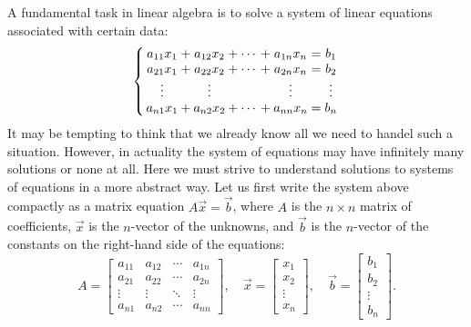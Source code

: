 \documentclass{ximera}
\begin{document}
A fundamental task in linear algebra is to solve a system of linear
equations associated with certain data:
\begin{equation*}
  \left\{ \,
  \begin{array}{*{9}{@{}c@{}}}
    a_{11} x_1      & {}+{} & a_{12} x_2 & {}+{} & \cdots & {}+{} & a_{1n} x_n
                    &
    {}\mathrel{=}{} & b_1
    \\
    a_{21} x_1      & {}+{} & a_{22} x_2 & {}+{} & \cdots & {}+{} & a_{2n} x_n
                    &
    {}\mathrel{=}{} & b_2
    \\
    \vdots          &       & \vdots     &       &        &       & \vdots
                    &       & \vdots
    \\
    a_{n1} x_1      & {}+{} & a_{n2} x_2 & {}+{} & \cdots & {}+{} & a_{nn} x_n
                    &
    {}\mathrel{=}{} & b_n
  \end{array}
  \, \right.
\end{equation*}
It may be tempting to think that we already know all we need to handel such a
situation. However, in actuality the system of equations may have infinitely many
solutions or none at all. Here we must strive to understand solutions to systems of equations in a more
abstract way. Let us first write the system above compactly as a matrix equation $A \vec{x} =
  \vec{b}$, where $A$ is the $n \times n$ matrix of coefficients, $\vec{x}$ is
the
$n$-vector of the unknowns, and $\vec{b}$ is the $n$-vector of the constants on
the right-hand side of the equations:
\[
  A =
  \begin{bmatrix}
    a_{11} & a_{12} & \cdots & a_{1n} \\
    a_{21} & a_{22} & \cdots & a_{2n} \\
    \vdots & \vdots & \ddots & \vdots \\
    a_{n1} & a_{n2} & \cdots & a_{nn}
  \end{bmatrix}, \quad
  \vec{x} =
  \begin{bmatrix}
    x_1 \\ x_2 \\ \vdots \\ x_n
  \end{bmatrix}, \quad
  \vec{b} =
  \begin{bmatrix}
    b_1 \\ b_2 \\ \vdots \\ b_n
  \end{bmatrix}.
\]
\end{document}
